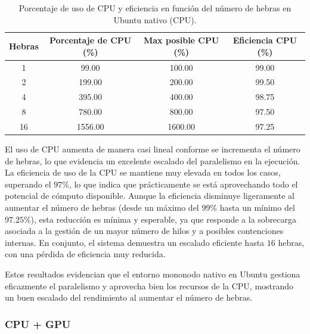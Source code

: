 \begin{table}[ht]
    \centering
    \begin{tabular}{|c|c|c|c|}
        \hline
        \textbf{Hebras} & \textbf{Porcentaje de CPU (\%)} & \textbf{Max posible CPU (\%)} & \textbf{Eficiencia CPU (\%)} \\
        \hline
        1               & 99.00                           & 100.00                        & 99.00                        \\
        2               & 199.00                          & 200.00                        & 99.50                        \\
        4               & 395.00                          & 400.00                        & 98.75                        \\
        8               & 780.00                          & 800.00                        & 97.50                        \\
        16              & 1556.00                         & 1600.00                       & 97.25                        \\
        \hline
    \end{tabular}
    \caption{Porcentaje de uso de CPU y eficiencia en función del número de hebras en Ubuntu nativo (CPU).}
    \label{tab:single-node_ubuntu_cpu_native_cpu}
\end{table}

El uso de CPU aumenta de manera casi lineal conforme se incrementa el número de hebras, lo que evidencia un excelente escalado del paralelismo en la ejecución. La eficiencia de uso de la CPU se mantiene muy elevada en todos los casos, superando el $97\%$, lo que indica que prácticamente se está aprovechando todo el potencial de cómputo disponible. Aunque la eficiencia disminuye ligeramente al aumentar el número de hebras (desde un máximo del $99\%$ hasta un mínimo del $97.25\%$), esta reducción es mínima y esperable, ya que responde a la sobrecarga asociada a la gestión de un mayor número de hilos y a posibles contenciones internas. En conjunto, el sistema demuestra un escalado eficiente hasta $16$ hebras, con una pérdida de eficiencia muy reducida.

Estos resultados evidencian que el entorno mononodo nativo en Ubuntu gestiona eficazmente el paralelismo y aprovecha bien los recursos de la CPU, mostrando un buen escalado del rendimiento al aumentar el número de hebras.

\subsubsection{CPU + GPU}


